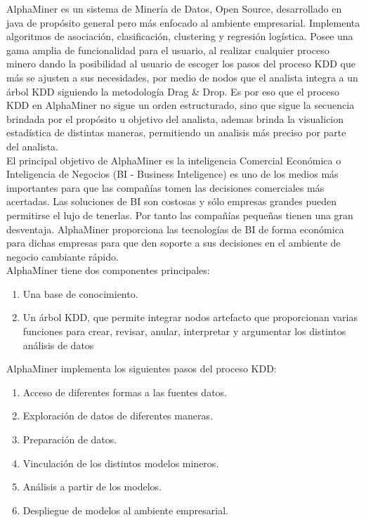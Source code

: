 AlphaMiner es un sistema de Miner\'ia de Datos, Open Source, desarro\-llado en java de prop\'osito general pero
m\'as enfocado al ambiente  empresa\-rial. Implementa algoritmos de asociaci\'on, clasificaci\'on, clustering y
regresi\'on log\'istica. Posee una gama amplia de funcionalidad para el usuario, al realizar cualquier proceso
minero dando la posibilidad al usuario de escoger los pasos del proceso KDD que m\'as se ajusten a sus
necesidades, por medio de nodos que el analista integra a un \'arbol KDD siguiendo la metodolog\'ia Drag \& Drop. 
Es por eso que el proceso KDD en AlphaMiner no sigue un orden estructurado, sino que sigue la secuencia  brindada
por el prop\'osito u objetivo  del analista, ademas brinda la visualicion estad\'istica de distintas maneras, 
permitiendo un analisis m\'as preciso por parte del analista.\\

El principal objetivo de AlphaMiner es la inteligencia Comercial Econ\'omica o Inteligencia de Negocios (BI -
Business Inteligence) es uno de los  medios m\'as importantes para que las compa\~n\'ias tomen las decisiones
comerciales m\'as acertadas. Las soluciones de BI son costosas y s\'olo empresas grandes pueden permitirse el
lujo de tenerlas. Por tanto las compa\~n\'ias peque\~nas tienen una gran desventaja. AlphaMiner proporciona las
tecnolog\'ias de BI de forma econ\'omica para dichas empresas para que den soporte a sus decisiones en el
ambiente de negocio cambiante r\'apido.\\
   
AlphaMiner tiene dos componentes principales:
\begin{enumerate}
\item Una base de conocimiento.
\item Un \'arbol KDD, que permite integrar nodos artefacto que proporcionan varias funciones para crear, revisar,
anular, interpretar y argumentar los distintos an\'alisis de datos
\end{enumerate}

AlphaMiner implementa los siguientes pasos del proceso KDD:
\begin{enumerate}
\item Acceso de diferentes formas a las fuentes datos.
\item Exploraci\'on de datos de diferentes maneras.
\item Preparaci\'on de datos.
\item Vinculaci\'on de los distintos modelos mineros.
\item An\'alisis a partir de los  modelos.
\item Despliegue de modelos al ambiente  empresarial.   
\end{enumerate}

